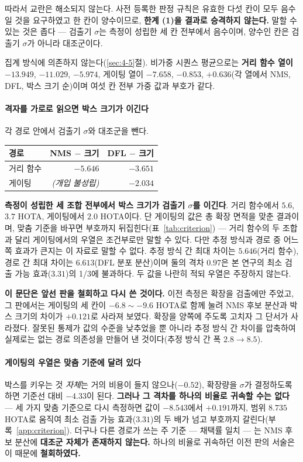 \documentclass[12pt,a4paper,oneside]{report}
\begin{document}
따라서 교란은 해소되지 않는다. 사전 등록한 판정 규칙은 유효한 다섯 칸이 모두 음수일 것을 요구하였고 한 칸이 양수이므로, \textbf{한계 (1)을 결과로 승격하지 않는다.} 말할 수 있는 것은 좁다 --- 검출기 $\sigma$는 측정이 성립한 세 칸 전부에서 음수이며, 양수인 칸은 검출기 $\sigma$가 아니라 대조군이다.

집계 방식에 의존하지 않는다(\ref{sec:4-5}절). 비가중 시퀀스 평균으로는 \textbf{거리 함수 열이} $-13.949$, $-11.029$, $-5.974$, 게이팅 열이 $-7.658$, $-0.853$, $+0.636$(각 열에서 NMS, DFL, 박스 크기 순)이며 여섯 칸 전부 가중 값과 부호가 같다.

\paragraph{격자를 가로로 읽으면 박스 크기가 이긴다} 각 경로 안에서 검출기 $\sigma$와 대조군을 뺀다.

\begin{center}
\small
\begin{tabular}{lrr}
\toprule
\textbf{경로} & NMS $-$ 크기 & DFL $-$ 크기 \\
\midrule
거리 함수 & $-5.646$ & $-3.651$ \\
게이팅 & \textit{(개입 불성립)} & $\mathbf{-2.034}$ \\
\bottomrule
\end{tabular}
\end{center}

\textbf{측정이 성립한 세 조합 전부에서 박스 크기가 검출기 $\sigma$를 이긴다}. 거리 함수에서 $5.6$, $3.7$ HOTA, 게이팅에서 $2.0$ HOTA이다. 단 게이팅의 값은 총 확장 면적을 맞춘 결과이며, 맞춤 기준을 바꾸면 부호까지 뒤집힌다(표~\ref{tab:criterion}) --- 거리 함수의 두 조합과 달리 게이팅에서의 우열은 조건부로만 말할 수 있다. 다만 추정 방식과 경로 중 어느 쪽 효과가 큰지는 이 자료로 말할 수 없다. 추정 방식 간 최대 차이는 $5.646$(거리 함수), 경로 간 최대 차이는 $6.613$(DFL 분포 분산)이며 둘의 격차 $0.97$은 본 연구의 최소 검출 가능 효과($3.31$)의 1/3에 불과하다. 두 값을 나란히 적되 우열은 주장하지 않는다.

\textbf{이 문단은 앞선 판을 철회하고 다시 쓴 것이다.} 이전 측정은 확장을 검출에만 주었고, 그 판에서는 게이팅의 세 칸이 $-6.8 \sim -9.6$ HOTA로 함께 눌려 NMS 후보 분산과 박스 크기의 차이가 $+0.121$로 사라져 보였다. 확장을 양쪽에 주도록 고치자 그 단서가 사라졌다. 잘못된 통제가 값의 수준을 낮추었을 뿐 아니라 추정 방식 간 차이를 압축하여 실제로는 없는 경로 의존성을 만들어 낸 것이다(추정 방식 간 폭 $2.8 \to 8.5$).

\paragraph{게이팅의 우열은 맞춤 기준에 달려 있다} 박스를 키우는 것 \textit{자체}는 거의 비용이 들지 않으나($-0.52$), 확장량을 $\sigma$가 결정하도록 하면 기준선 대비 $-4.33$이 된다. \textbf{그러나 그 격차를 하나의 비율로 귀속할 수는 없다} --- 세 가지 맞춤 기준으로 다시 측정하면 값이 $-8.543$에서 $+0.191$까지, 범위 $8.735$ HOTA로 움직여 최소 검출 가능 효과($3.31$)의 두 배가 넘고 부호까지 갈린다(부록~\ref{app:criterion}). 더구나 다른 경로가 쓰는 주 기준 --- 채택률 일치 --- 는 NMS 후보 분산에 \textbf{대조군 자체가 존재하지 않는다.} 하나의 비율로 귀속하던 이전 판의 서술은 이 때문에 \textbf{철회하였다.}
\end{document}
